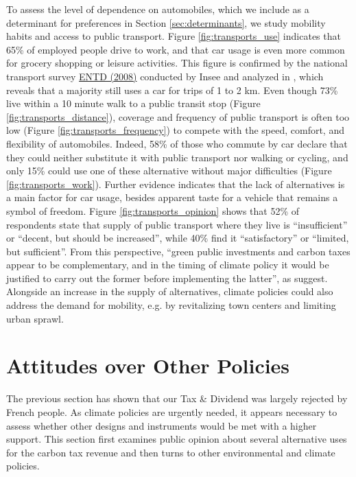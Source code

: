 \documentclass[english,5p,authoryear]{elsarticle}
\begin{document}
To assess the level of dependence on automobiles, which we include as a determinant for preferences in Section \ref{sec:determinants}, we study mobility habits and access to public transport. Figure \ref{fig:transports_use} indicates that 65\% of employed people drive to work, and that car usage is even more common for grocery shopping or leisure activities. This figure is confirmed by the national transport survey \href{http://www.progedo-adisp.fr/enquetes/XML/lil-0634.xml}{ENTD (2008)} conducted by Insee and analyzed in \cite{pappalardo_mobilite_2010}, which reveals that a majority still uses a car for trips of 1 to 2 km. Even though 73\% live within a 10 minute walk to a public transit stop (Figure \ref{fig:transports_distance}), coverage and frequency of public transport is often too low (Figure \ref{fig:transports_frequency}) to compete with the speed, comfort, and flexibility of automobiles. Indeed, 58\% of those who commute by car declare that they could neither substitute it with public transport nor walking or cycling, and only 15\% could use one of these alternative without major difficulties (Figure \ref{fig:transports_work}). Further evidence indicates that the lack of alternatives is a main factor for car usage, besides apparent taste for a vehicle that remains a symbol of freedom. Figure \ref{fig:transports_opinion} shows that 52\% of respondents state that supply of public transport where they live is ``insufficient'' or ``decent, but should be increased'', while 40\% find it ``satisfactory'' or ``limited, but sufficient''. From this perspective, ``green public investments and carbon taxes appear to be complementary, and in the timing of climate policy it would be justified to carry out the former before implementing the latter'', as \cite{bureau_pour_2019} suggest. Alongside an increase in the supply of alternatives, climate policies could also address the demand for mobility, e.g. by revitalizing town centers and limiting urban sprawl.

%

%

%
%
%

%

\section{Attitudes over Other Policies}\label{sec:attitudes_other_policies}

The previous section has shown that our Tax \& Dividend was largely rejected by French people. As climate policies are urgently needed, it appears necessary to assess whether other designs and instruments would be met with a higher support. This section first examines public opinion about several alternative uses for the carbon tax revenue and then turns to other environmental and climate policies.
\end{document}
